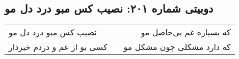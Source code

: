 \begin{center}
\section*{دوبیتی شماره ۲۰۱: نصیب کس مبو درد دل مو}
\label{sec:201}
\begin{longtable}{l p{0.5cm} r}
نصیب کس مبو درد دل مو
&&
که بسیاره غم بی‌حاصل مو
\\
کسی بو از غم و دردم خبردار
&&
که دارد مشکلی چون مشکل مو
\\
\end{longtable}
\end{center}
